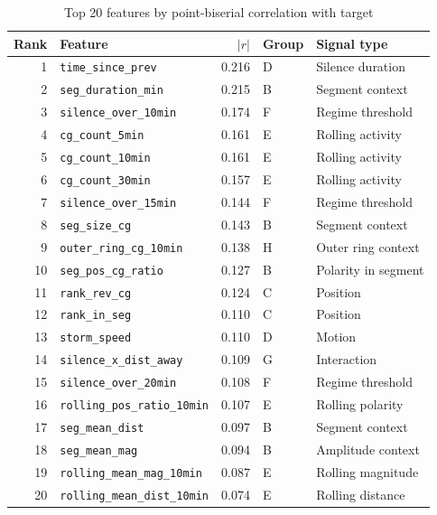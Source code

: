 \documentclass[12pt,a4paper]{article}
\begin{document}
\begin{table}[H]
\centering
\caption{Top 20 features by point-biserial correlation with target}
\begin{tabular}{rlrll}
\toprule
\textbf{Rank} & \textbf{Feature} & $|r|$ & \textbf{Group} & \textbf{Signal type} \\
\midrule
1  & \texttt{time\_since\_prev}       & 0.216 & D & Silence duration \\
2  & \texttt{seg\_duration\_min}      & 0.215 & B & Segment context \\
3  & \texttt{silence\_over\_10min}    & 0.174 & F & Regime threshold \\
4  & \texttt{cg\_count\_5min}         & 0.161 & E & Rolling activity \\
5  & \texttt{cg\_count\_10min}        & 0.161 & E & Rolling activity \\
6  & \texttt{cg\_count\_30min}        & 0.157 & E & Rolling activity \\
7  & \texttt{silence\_over\_15min}    & 0.144 & F & Regime threshold \\
8  & \texttt{seg\_size\_cg}           & 0.143 & B & Segment context \\
9  & \texttt{outer\_ring\_cg\_10min}  & 0.138 & H & Outer ring context \\
10 & \texttt{seg\_pos\_cg\_ratio}     & 0.127 & B & Polarity in segment \\
11 & \texttt{rank\_rev\_cg}           & 0.124 & C & Position \\
12 & \texttt{rank\_in\_seg}           & 0.110 & C & Position \\
13 & \texttt{storm\_speed}            & 0.110 & D & Motion \\
14 & \texttt{silence\_x\_dist\_away}  & 0.109 & G & Interaction \\
15 & \texttt{silence\_over\_20min}    & 0.108 & F & Regime threshold \\
16 & \texttt{rolling\_pos\_ratio\_10min} & 0.107 & E & Rolling polarity \\
17 & \texttt{seg\_mean\_dist}         & 0.097 & B & Segment context \\
18 & \texttt{seg\_mean\_mag}          & 0.094 & B & Amplitude context \\
19 & \texttt{rolling\_mean\_mag\_10min}  & 0.087 & E & Rolling magnitude \\
20 & \texttt{rolling\_mean\_dist\_10min} & 0.074 & E & Rolling distance \\
\bottomrule
\end{tabular}
\end{table}
\end{document}
